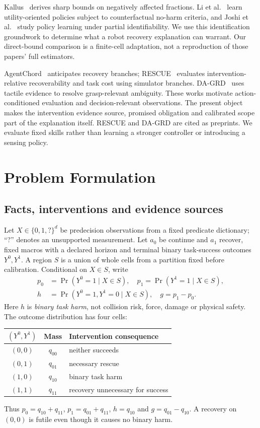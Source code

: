 \documentclass[conference]{IEEEtran}
\begin{document}
Kallus~\cite{kallus2022} derives sharp bounds on negatively affected fractions. Li et al.~\cite{li2023} learn utility-oriented policies subject to counterfactual no-harm criteria, and Joshi et al.~\cite{joshi2024} study policy learning under partial identifiability. We use this identification groundwork to determine what a robot recovery explanation can warrant. Our direct-bound comparison is a finite-cell adaptation, not a reproduction of those papers' full estimators.

AgentChord~\cite{agentchord} anticipates recovery branches; RESCUE~\cite{rescue} evaluates intervention-relative recoverability and task cost using simulator branches. DA-GRD~\cite{dagrd} uses tactile evidence to resolve grasp-relevant ambiguity. These works motivate action-conditioned evaluation and decision-relevant observations. The present object makes the intervention evidence source, promised obligation and calibrated scope part of the explanation itself. RESCUE and DA-GRD are cited as preprints. We evaluate fixed skills rather than learning a stronger controller or introducing a sensing policy.

\section{Problem Formulation}
\subsection{Facts, interventions and evidence sources}
Let $X\in\{0,1,?\}^{d}$ be predecision observations from a fixed predicate dictionary; ``?'' denotes an unsupported measurement. Let $a_0$ be continue and $a_1$ recover, fixed macros with a declared horizon and terminal binary task-success outcomes $Y^0,Y^1$. A region $S$ is a union of whole cells from a partition fixed before calibration. Conditional on $X\in S$, write
\begin{equation}
\begin{split}
 p_0&=\Pr(Y^0=1\mid X\in S),\quad p_1=\Pr(Y^1=1\mid X\in S),\\
 h&=\Pr(Y^0=1,Y^1=0\mid X\in S),\quad g=p_1-p_0.
\end{split}\label{eq:estimands}
\end{equation}
Here $h$ is \emph{binary task harm}, not collision risk, force, damage or physical safety. The outcome distribution has four cells:
\begin{center}
\begin{tabular}{ccl}
\toprule
$(Y^0,Y^1)$ & Mass & Intervention consequence\\
\midrule
$(0,0)$ & $q_{00}$ & neither succeeds\\
$(0,1)$ & $q_{01}$ & necessary rescue\\
$(1,0)$ & $q_{10}$ & binary task harm\\
$(1,1)$ & $q_{11}$ & recovery unnecessary for success\\
\bottomrule
\end{tabular}
\end{center}
Thus $p_0=q_{10}+q_{11}$, $p_1=q_{01}+q_{11}$, $h=q_{10}$ and $g=q_{01}-q_{10}$. A recovery on $(0,0)$ is futile even though it causes no binary harm.
\end{document}
